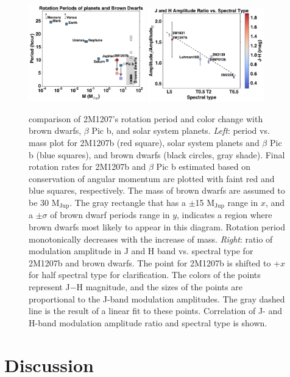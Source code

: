 \documentclass[apj]{emulateapj}
\newcommand{\bpic}{$\beta$ Pic}
\newcommand{\mjup}{M$_{\mathrm{Jup}}$}
\begin{document}
\begin{figure}
  \centering
    \includegraphics[width=0.45\textwidth]{f5a}
  \includegraphics[width=0.45\textwidth]{f5b}
  \caption{comparison of 2M1207's rotation period and color change
    with brown dwarfs, \bpic{} b, and solar system planets. {\em
      Left}: period vs. mass plot for 2M1207b (red square), solar
    system planets and \bpic{} b (blue squares), and brown dwarfs
    (black circles, gray shade). Final rotation rates for 2M1207b and
    \bpic{} b estimated based on conservation of angular momentum are
    plotted with faint red and blue squares, respectively. The mass of brown dwarfs are assumed
    to be 30 \mjup{}. The gray rectangle that has a $\pm$15 \mjup
    range in $x$, and a $\pm \sigma$ of brown dwarf periods range in
    $y$, indicates a region where brown dwarfs most likely to appear
    in this diagram. Rotation period monotonically decreases with the
    increase of mass. {\em Right}: ratio of modulation amplitude in J
    and H band vs. spectral type for 2M1207b and brown dwarfs. The
    point for 2M1207b is shifted to +$x$ for half spectral type for
    clarification.  The colors of the points represent J$-$H
    magnitude, and the sizes of the points are proportional to the
    J-band modulation amplitudes. The gray dashed line is the result
    of a linear fit to these points.  Correlation of J- and
    H-band modulation amplitude ratio and spectral type is shown.}
 \label{fig:5}
\end{figure}

\section{Discussion}
\end{document}
